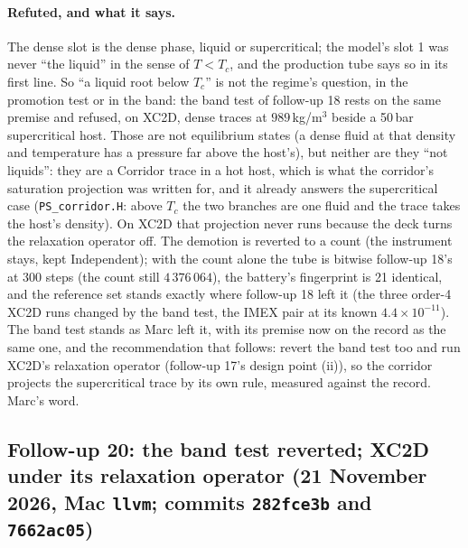 \documentclass[11pt,a4paper]{article}
\newcommand{\code}[1]{\texttt{\small #1}}
\begin{document}
\paragraph{Refuted, and what it says.}  The dense slot is the dense
phase, liquid or supercritical; the model's slot 1 was never ``the
liquid'' in the sense of $T < T_c$, and the production tube says so in
its first line.  So ``a liquid root below $T_c$'' is not the regime's
question, in the promotion test or in the band: the band test of
follow-up 18 rests on the same premise and refused, on XC2D, dense
traces at $989$\,kg/m$^3$ beside a 50\,bar supercritical host.  Those
are not equilibrium states (a dense fluid at that density and
temperature has a pressure far above the host's), but neither are they
``not liquids'': they are a Corridor trace in a hot host, which is what
the corridor's saturation projection was written for, and it already
answers the supercritical case (\code{PS\_corridor.H}: above $T_c$ the
two branches are one fluid and the trace takes the host's density).  On
XC2D that projection never runs because the deck turns the relaxation
operator off.  The demotion is reverted to a count (the instrument
stays, kept Independent); with the count alone the tube is bitwise follow-up 18's at 300 steps (the count still $4\,376\,064$), the battery's fingerprint is 21 identical, and the reference set stands exactly where follow-up 18 left it (the three order-4 XC2D runs changed by the band test, the IMEX pair at its known $4.4\times10^{-11}$).  The band test stands as
Marc left it, with its premise now on the record as the same one, and
the recommendation that follows: revert the band test too and run
XC2D's relaxation operator (follow-up 17's design point (ii)), so the
corridor projects the supercritical trace by its own rule, measured
against the record.  Marc's word.


\subsection{Follow-up 20: the band test reverted; XC2D under its relaxation operator (21 November 2026, Mac \code{llvm}; commits \code{282fce3b} and \code{7662ac05})}
\end{document}
